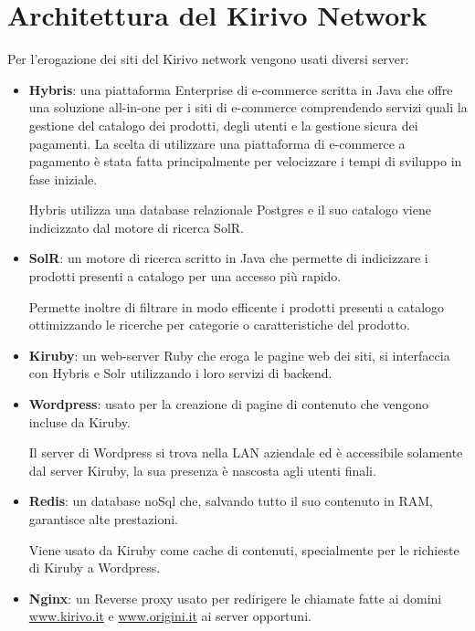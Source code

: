 \section{Architettura del Kirivo Network}
Per l'erogazione dei siti del Kirivo network vengono usati diversi server:
\begin{itemize}
\item {\bf Hybris}: una piattaforma Enterprise di e-commerce scritta in Java che offre una soluzione all-in-one per i siti 
di e-commerce comprendendo servizi quali la gestione del catalogo dei prodotti, degli utenti e la 
gestione sicura dei pagamenti. La scelta di utilizzare una piattaforma di e-commerce a pagamento è stata fatta
principalmente per velocizzare i tempi di sviluppo in fase iniziale.

Hybris utilizza una database relazionale Postgres e il suo catalogo viene indicizzato dal motore di ricerca SolR.

\item {\bf SolR}: un motore di ricerca scritto in Java che permette di indicizzare i prodotti presenti a catalogo per una accesso
più rapido.

Permette inoltre di filtrare in modo efficente i prodotti presenti a catalogo ottimizzando
le ricerche per categorie o caratteristiche del prodotto.

\item {\bf Kiruby}: un web-server Ruby che eroga le pagine web dei siti, si interfaccia con Hybris e Solr utilizzando i loro
servizi di backend. 
\item {\bf Wordpress}: usato per la creazione di pagine di contenuto che vengono incluse da Kiruby.

Il server di Wordpress si trova nella LAN aziendale ed è accessibile solamente dal server Kiruby, la sua
presenza è nascosta agli utenti finali.
\item {\bf Redis}: un database noSql che, salvando tutto il suo contenuto in RAM, garantisce alte prestazioni.

Viene usato da Kiruby come cache di contenuti, specialmente per le richieste di Kiruby a Wordpress.

\item {\bf Nginx}: un Reverse proxy usato per redirigere le chiamate fatte ai domini \url{www.kirivo.it} 
e \url{www.origini.it} ai server opportuni.
\end{itemize}

